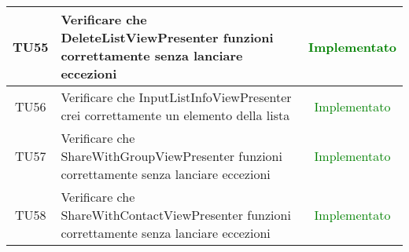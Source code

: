 \begin{center}
\begin{longtable}{|c|>{\centering}m{10cm}|c|}
		TU55 & Verificare che DeleteListViewPresenter funzioni correttamente senza lanciare eccezioni & \textcolor{Green}{Implementato}\\ \hline
		TU56 & Verificare che InputListInfoViewPresenter crei correttamente un elemento della lista & \textcolor{Green}{Implementato}\\ \hline
		TU57 & Verificare che ShareWithGroupViewPresenter funzioni correttamente senza lanciare eccezioni & \textcolor{Green}{Implementato}\\ \hline
		TU58 & Verificare che ShareWithContactViewPresenter funzioni correttamente senza lanciare eccezioni & \textcolor{Green}{Implementato}\\ \hline
	\end{longtable}
\end{center}
